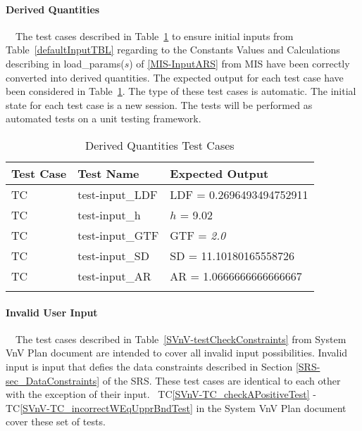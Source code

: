 \documentclass[12pt]{article}
\newcommand{\tcref}[1]{TC\ref{#1}}
\newcounter{utestnum} %
\begin{document}
\paragraph{Derived Quantities}

~\newline ~\newline \noindent The test cases described in Table~\ref{DerivedValueTests} 
to ensure initial inputs from Table~\ref{defaultInputTBL}  regarding to the Constants Values and Calculations describing in load\_params($s$) of \ref{MIS-InputARS} from MIS have been correctly converted into derived quantities. The expected output for each test case have been considered in 
Table~\ref{DerivedValueTests}. The type of these test cases is automatic. The initial 
state for each test case is a new session. The tests will be performed as automated tests on a unit testing 
framework.	

\begin{longtable}{  l  p{4cm}  p{6cm}  }
	\hline
	\textbf{Test Case} & \textbf{Test Name} & \textbf{Expected Output} \\
	\hline
	TC{utestnum}\theutestnum  \label{TC_LDF} & 
	test-input\_LDF &  $\text{LDF}$ = 0.2696493494752911\\
	\hline 
	TC{utestnum}\theutestnum  \label{TC_h} & 
	test-input\_h &  $h$ = 9.02\\ 
	\hline
	TC{utestnum}\theutestnum  \label{TC_GTF} & 
	test-input\_GTF &   $\mbox{GTF}$ = \textit{2.0}\\ 
	\hline
	TC{utestnum}\theutestnum  \label{TC_SD} & 
	test-input\_SD &  $\mbox{SD}$ = 11.10180165558726\\ 
	\hline
	TC{utestnum}\theutestnum  \label{TC_AR} & 
	test-input\_AR &  $\mbox{AR}$ = 1.0666666666666667\\ 
	\hline
	\caption{Derived Quantities Test Cases}
	\label{DerivedValueTests}
\end{longtable}


\paragraph{Invalid User Input}


~\newline ~\newline \noindent The test cases described in Table~\ref{SVnV-testCheckConstraints} from System VnV Plan document are intended to cover all invalid input possibilities. Invalid input is input 
that defies the data constraints described in Section 
\ref{SRS-sec_DataConstraints} of the SRS. These test cases are identical to 
each other with the exception of their input. 
~\newline \noindent  \tcref{SVnV-TC_checkAPositiveTest} - 
\tcref{SVnV-TC_incorrectWEqUpprBndTest} in the System VnV Plan document cover these set of tests.
	
\end{document}
